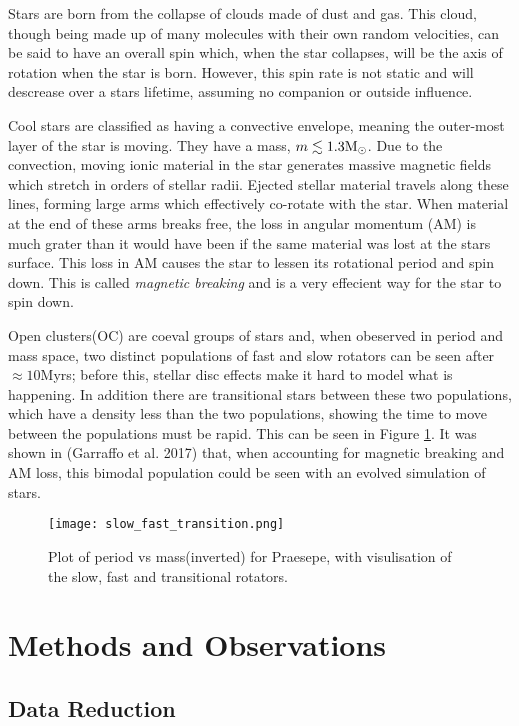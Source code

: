 \documentclass[fleqn,usenatbib]{mnras}
\begin{document}
Stars are born from the collapse of clouds made of dust and gas.
This cloud, though being made up of many molecules with their own random velocities, can be said to have an overall spin which, when the star collapses, will be the axis of rotation when the star is born.
However, this spin rate is not static and will descrease over a stars lifetime, assuming no companion or outside influence.

Cool stars are classified as having a convective envelope, meaning the outer-most layer of the star is moving.
They have a mass, $m \lesssim 1.3 \textup{M}_\odot$. 
Due to the convection, moving ionic material in the star generates massive magnetic fields which stretch in orders of stellar radii.
Ejected stellar material travels along these lines, forming large arms which effectively co-rotate with the star.
When material at the end of these arms breaks free, the loss in angular momentum (AM) is much grater than it would have been if the same material was lost at the stars surface.
This loss in AM causes the star to lessen its rotational period and spin down.
This is called \textit{magnetic breaking} and is a very effecient way for the star to spin down.

Open clusters(OC) are coeval groups of stars and, when obeserved in period and mass space, two distinct populations of fast and slow rotators can be seen after $\approx 10$Myrs; before this, stellar disc effects make it hard to model what is happening.
In addition there are  transitional stars between these two populations, which have a density less than the two populations, showing the time to move between the populations must be rapid.
This can be seen in Figure \ref{fig:slow_fast_transition}.
It was shown in \cite{}(Garraffo et al. 2017) that, when accounting for magnetic breaking and AM loss, this bimodal population could be seen with an evolved simulation of stars.
\begin{figure}
	\texttt{[image: slow\_fast\_transition.png]}
	\caption[]{Plot of period vs mass(inverted) for Praesepe, with visulisation of the slow, fast and transitional rotators.}
	\label{fig:slow_fast_transition}
\end{figure}

\section{Methods and Observations}
\subsection{Data Reduction}
\end{document}
